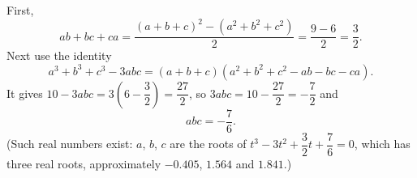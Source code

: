 First,
\[ab+bc+ca=\dfrac{(a+b+c)^2-(a^2+b^2+c^2)}{2}=\dfrac{9-6}{2}=\dfrac32.\]
Next use the identity
\[a^3+b^3+c^3-3abc=(a+b+c)\left(a^2+b^2+c^2-ab-bc-ca\right).\]
It gives $10-3abc=3\left(6-\dfrac32\right)=\dfrac{27}{2}$, so $3abc=10-\dfrac{27}{2}=-\dfrac72$ and
\[abc=\boxed{-\dfrac76}.\]
(Such real numbers exist: $a$, $b$, $c$ are the roots of $t^3-3t^2+\dfrac32t+\dfrac76=0$, which has three real roots, approximately $-0.405$, $1.564$ and $1.841$.)
